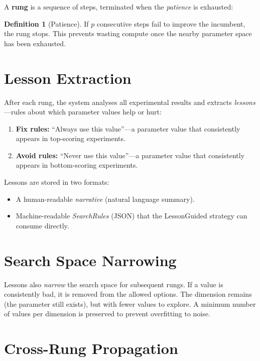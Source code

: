 \documentclass[11pt,a4paper,twoside]{report}
\theoremstyle{definition}
\newtheorem{definition}{Definition}[chapter]
\begin{document}
A \textbf{rung} is a sequence of steps, terminated when the
\emph{patience} is exhausted:

\begin{definition}[Patience]
If $p$ consecutive steps fail to improve the incumbent, the rung stops.
This prevents wasting compute once the nearby parameter space has been
exhausted.
\end{definition}

\section{Lesson Extraction}
\label{sec:lessons}

After each rung, the system analyses all experimental results and
extracts \emph{lessons}---rules about which parameter values help or
hurt:

\begin{enumerate}
  \item \textbf{Fix rules:} ``Always use this value''---a parameter
        value that consistently appears in top-scoring experiments.
  \item \textbf{Avoid rules:} ``Never use this value''---a parameter
        value that consistently appears in bottom-scoring experiments.
\end{enumerate}

Lessons are stored in two formats:
\begin{itemize}
  \item A human-readable \emph{narrative} (natural language summary).
  \item Machine-readable \emph{SearchRules} (JSON) that the
        LessonGuided strategy can consume directly.
\end{itemize}

\section{Search Space Narrowing}

Lessons also \emph{narrow} the search space for subsequent rungs.
If a value is consistently bad, it is removed from the allowed options.
The dimension remains (the parameter still exists), but with fewer
values to explore. A minimum number of values per dimension is preserved
to prevent overfitting to noise.

\section{Cross-Rung Propagation}
\end{document}
